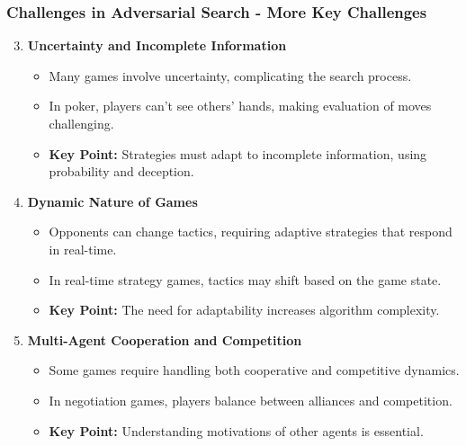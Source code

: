 \documentclass[aspectratio=169]{beamer}
\begin{document}
\begin{frame}[fragile]
    \frametitle{Challenges in Adversarial Search - More Key Challenges}
    \begin{enumerate}
        \setcounter{enumi}{2} %
        \item \textbf{Uncertainty and Incomplete Information}
            \begin{itemize}
                \item Many games involve uncertainty, complicating the search process.
                \item In poker, players can't see others' hands, making evaluation of moves challenging.
                \item \textbf{Key Point:} Strategies must adapt to incomplete information, using probability and deception.
            \end{itemize}

        \item \textbf{Dynamic Nature of Games}
            \begin{itemize}
                \item Opponents can change tactics, requiring adaptive strategies that respond in real-time.
                \item In real-time strategy games, tactics may shift based on the game state.
                \item \textbf{Key Point:} The need for adaptability increases algorithm complexity.
            \end{itemize}
        
        \item \textbf{Multi-Agent Cooperation and Competition}
            \begin{itemize}
                \item Some games require handling both cooperative and competitive dynamics.
                \item In negotiation games, players balance between alliances and competition.
                \item \textbf{Key Point:} Understanding motivations of other agents is essential. 
            \end{itemize}
    \end{enumerate}
\end{frame}
\end{document}
